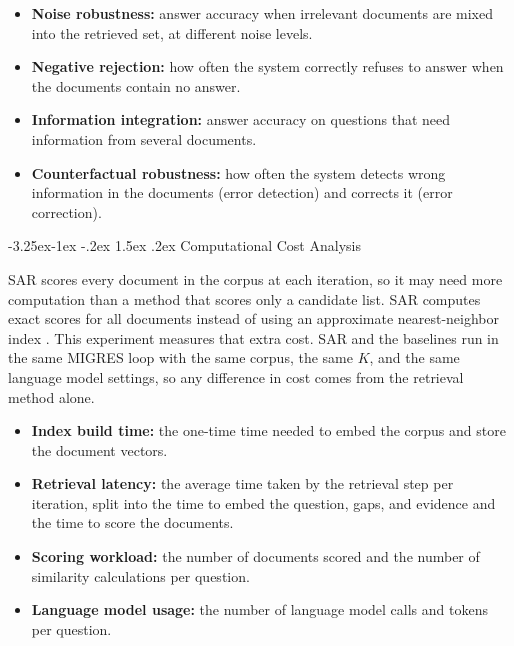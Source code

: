 \documentclass[12pt,a4paper]{report}
\makeatletter
\renewcommand\subsection{\@startsection{subsection}{2}{\z@}%
    {-3.25ex\@plus -1ex \@minus -.2ex}%
    {1.5ex \@plus .2ex}%
    {\normalfont\fontsize{14}{17}\selectfont\bfseries}}
\makeatother
\begin{document}
\begin{itemize}[leftmargin=0.25in,itemsep=0.06in,parsep=0pt]
\item \textbf{Noise robustness:} answer accuracy when irrelevant documents are mixed into the retrieved set, at different noise levels.
\item \textbf{Negative rejection:} how often the system correctly refuses to answer when the documents contain no answer.
\item \textbf{Information integration:} answer accuracy on questions that need information from several documents.
\item \textbf{Counterfactual robustness:} how often the system detects wrong information in the documents (error detection) and corrects it (error correction).
\end{itemize}

\subsection{Computational Cost Analysis}

SAR scores every document in the corpus at each iteration, so it may need more computation than a method that scores only a candidate list. SAR computes exact scores for all documents instead of using an approximate nearest-neighbor index \cite{johnson2017billion}. This experiment measures that extra cost. SAR and the baselines run in the same MIGRES loop with the same corpus, the same $K$, and the same language model settings, so any difference in cost comes from the retrieval method alone.

\begin{itemize}[leftmargin=0.25in,itemsep=0.06in,parsep=0pt]
\item \textbf{Index build time:} the one-time time needed to embed the corpus and store the document vectors.
\item \textbf{Retrieval latency:} the average time taken by the retrieval step per iteration, split into the time to embed the question, gaps, and evidence and the time to score the documents.
\item \textbf{Scoring workload:} the number of documents scored and the number of similarity calculations per question.
\item \textbf{Language model usage:} the number of language model calls and tokens per question.
\end{itemize}
\end{document}
